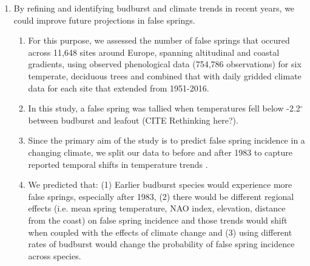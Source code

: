 \documentclass{article}\usepackage[]{graphicx}\usepackage[]{color}
\begin{document}
\begin{enumerate}
\item By refining and identifying budburst and climate trends in recent years, we could improve future projections in false springs. %
\begin{enumerate}
\item For this purpose, we assessed the number of false springs that occured across 11,648 sites around Europe, spanning altitudinal and coastal gradients, using observed phenological data (754,786 observations) for six temperate, deciduous trees and combined that with daily gridded climate data for each site that extended from 1951-2016. %
\item In this study, a false spring was tallied when temperatures fell below -2.2$^{\circ}$ \citep{Schwartz1993} between budburst and leafout (CITE Rethinking here?).
\item Since the primary aim of the study is to predict false spring incidence in a changing climate, we split our data to before and after 1983 to capture reported temporal shifts in temperature trends \citep{Stocker2013, Kharouba2018}.
\item We predicted that: (1) Earlier budburst species would experience more false springs, especially after 1983,  %
(2) there would be different regional effects (i.e. mean spring temperature, NAO index, elevation, distance from the coast) on false spring incidence and those trends would shift when coupled with the effects of climate change and (3) using different rates of budburst would change the probability of false spring incidence across species. 

\end{enumerate}
\end{enumerate}
\end{document}
